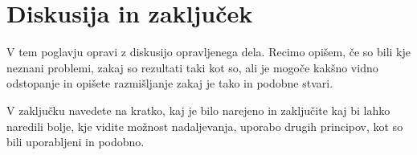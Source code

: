 \documentclass[pomnav,SMER=splošna]{fppthesis}
\begin{document}
\newpage
\section{Diskusija in zaključek}
\label{sec:Diskusija}

V tem poglavju opravi z diskusijo opravljenega dela. Recimo opišem, če so bili kje neznani problemi, zakaj so rezultati taki kot so, ali je mogoče kakšno vidno odstopanje in opišete razmišljanje zakaj je tako in podobne stvari.

V zaključku navedete na kratko, kaj je bilo narejeno in zaključite kaj bi lahko naredili bolje, kje vidite možnost nadaljevanja, uporabo drugih principov, kot so bili uporabljeni in podobno.



\cleardoublepage
\singlespacing
{}
\printbibliography
\end{document}
